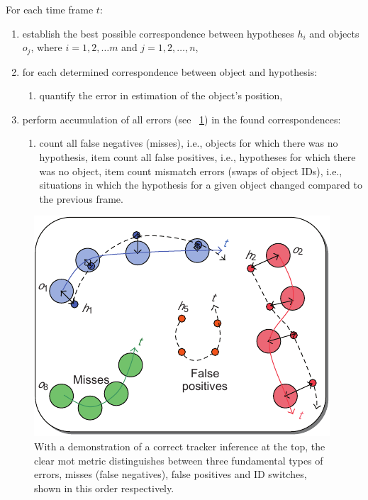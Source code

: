 For each time frame $t$:
\begin{enumerate}
    \item establish the best possible correspondence between hypotheses $h_i$ and objects $o_j$, where $i = 1, 2, \dots m$ and $j = 1, 2, \dots, n$,
    \item for each determined correspondence between object and hypothesis:
          \begin{enumerate}
              \item quantify the error in estimation of the object's position,
          \end{enumerate}
    \item perform accumulation of all errors (see \figstr{}~\ref{fig:CLEARHypotheses}) in the found correspondences:
          \begin{enumerate}
              \item count all false negatives (misses), i.e., objects for which there was no hypothesis,
                    item count all false positives, i.e., hypotheses for which there was no object,
                    item count mismatch errors (swaps of object IDs), i.e., situations in which the hypothesis for a given object changed compared to the previous frame.
          \end{enumerate}
\end{enumerate}

\begin{figure}[t]
    \centerline{\includegraphics[width=0.55\linewidth]{figures/theoretical_foundations/clear_hypotheses_status.pdf}}
    \caption[\gls{clear} hypotheses]{With a demonstration of a correct tracker inference at the top, the \gls{clear} \gls{mot} metric distinguishes between three fundamental types of errors, misses (false negatives), false positives and ID switches, shown in this order respectively. }
    \label{fig:CLEARHypotheses}
\end{figure}

